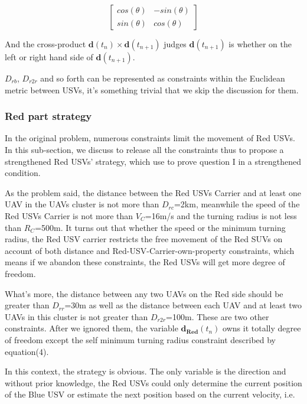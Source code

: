 \documentclass{mcmthesis}
\begin{document}
\begin{equation}
\left[
 \begin{matrix}
   cos(\theta) & -sin(\theta) \\
   sin(\theta) & cos(\theta)
  \end{matrix}
  \right] \tag{3}
\end{equation}

And the cross-product $\mathbf{d}(t_{n}) \times \mathbf{d}(t_{n+1})$ judges $\mathbf{d}(t_{n+1})$ is whether on the left or right hand side of $\mathbf{d}(t_{n+1})$.

$D_{rb}$, $D_{r2r}$ and so forth can be represented as constraints within the Euclidean metric between USVs, it's something trivial that we skip the discussion for them.

\subsubsection{Red part strategy}
In the original problem, numerous constraints limit the movement of Red USVs. In this sub-section, we discuss to release all the constraints thus to propose a strengthened Red USVs' strategy, which use to prove question I in a strengthened condition. \par

As the problem said, the distance between the Red USVs Carrier and at least one UAV in the UAVs cluster is not more than $D_{rc}$=2km, meanwhile the speed of the Red USVs Carrier is not more than $V_C$=16m/s and the turning radius is not less than $R_{C}$=500m. It turns out that whether the speed or the minimum turning radius, the Red USV carrier restricts the free movement of the Red SUVs on account of both distance and Red-USV-Carrier-own-property constraints, which means if we abandon these constraints, the Red USVs will get more degree of freedom. \par

What's more, the distance between any two UAVs on the Red side should be greater than $D_{rr}$=30m as well as the distance between each UAV and at least two UAVs in this cluster is not greater than $D_{r2r}$=100m. These are two other constraints. After we ignored them, the variable $\mathbf{d_{Red}}(t_{n})$ owns it totally degree of freedom except the self minimum turning radius constraint described by equation(4). \par

In this context, the strategy is obvious. The only variable is the direction and without prior knowledge, the Red USVs could only determine the current position of the Blue USV or estimate the next position based on the current velocity, i.e.
\end{document}
